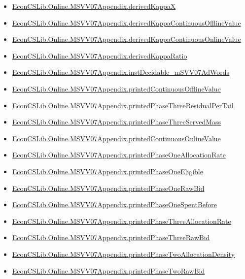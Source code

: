 \documentclass[10pt]{article}
\begin{document}
\begin{itemize}[leftmargin=1.2em]
\begin{itemize}[leftmargin=1.2em]
\item \hyperlink{library-prerequisite-90d9446d8a332a57}{EconCSLib.Online.MSVV07Appendix.derivedKappaX}
\item \hyperlink{library-prerequisite-10da234a84998620}{EconCSLib.Online.MSVV07Appendix.derivedKappaContinuousOfflineValue}
\item \hyperlink{library-prerequisite-26a6e229e061532e}{EconCSLib.Online.MSVV07Appendix.derivedKappaContinuousOnlineValue}
\item \hyperlink{library-prerequisite-f9a2ff51a0dd2164}{EconCSLib.Online.MSVV07Appendix.derivedKappaRatio}
\item \hyperlink{library-prerequisite-5eb7a46aa3a83097}{EconCSLib.Online.MSVV07Appendix.instDecidable\_mSVV07AdWords}
\item \hyperlink{library-prerequisite-d5442531195a7f0a}{EconCSLib.Online.MSVV07Appendix.printedContinuousOfflineValue}
\item \hyperlink{library-prerequisite-94c0f7f18c1210bf}{EconCSLib.Online.MSVV07Appendix.printedPhaseThreeResidualPerTail}
\item \hyperlink{library-prerequisite-255cb6d4eeb6957d}{EconCSLib.Online.MSVV07Appendix.printedPhaseThreeServedMass}
\item \hyperlink{library-prerequisite-a90dc563e71653ef}{EconCSLib.Online.MSVV07Appendix.printedContinuousOnlineValue}
\item \hyperlink{library-prerequisite-e5762d6d2b9353cd}{EconCSLib.Online.MSVV07Appendix.printedPhaseOneAllocationRate}
\item \hyperlink{library-prerequisite-93503c8fc3a0b656}{EconCSLib.Online.MSVV07Appendix.printedPhaseOneEligible}
\item \hyperlink{library-prerequisite-4b058f0549d65c4c}{EconCSLib.Online.MSVV07Appendix.printedPhaseOneRawBid}
\item \hyperlink{library-prerequisite-e91e9a6802320bfd}{EconCSLib.Online.MSVV07Appendix.printedPhaseOneSpentBefore}
\item \hyperlink{library-prerequisite-5c67c5b84996f0b1}{EconCSLib.Online.MSVV07Appendix.printedPhaseThreeAllocationRate}
\item \hyperlink{library-prerequisite-9fc27e6b2be91b19}{EconCSLib.Online.MSVV07Appendix.printedPhaseThreeRawBid}
\item \hyperlink{library-prerequisite-a1f851136b9d8d33}{EconCSLib.Online.MSVV07Appendix.printedPhaseTwoAllocationDensity}
\item \hyperlink{library-prerequisite-d23e66f8f26d470a}{EconCSLib.Online.MSVV07Appendix.printedPhaseTwoRawBid}

\end{itemize}
\end{itemize}
\end{document}
